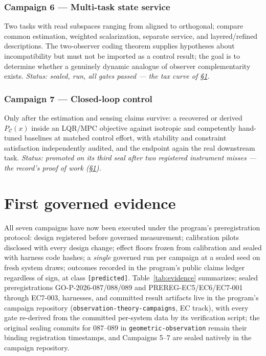 \documentclass[letterpaper,onecolumn]{IEEEtran}
\theoremstyle{definition}
\theoremstyle{remark}
\newcommand{\PC}{P_{\mathcal{C}}}
\begin{document}
\subsubsection*{Campaign 6 --- Multi-task state service}
Two tasks with read subspaces ranging from aligned to orthogonal; compare
common estimation, weighted scalarization, separate service, and
layered/refined descriptions. The two-observer coding theorem supplies
hypotheses about incompatibility but must not be imported as a control
result; the goal is to determine whether a genuinely dynamic analogue of
observer complementarity exists.
\emph{Status: sealed, run, all gates passed --- the tax curve of
\S\ref{sec:evidence}.}

\subsubsection*{Campaign 7 --- Closed-loop control}
Only after the estimation and sensing claims survive: a recovered or derived
$\PC(x)$ inside an LQR/MPC objective against isotropic and competently
hand-tuned baselines at matched control effort, with stability and
constraint satisfaction independently audited, and the endpoint again the
real downstream task.
\emph{Status: promoted on its third seal after two registered instrument
misses --- the record's proof of work (\S\ref{sec:evidence}).}

\section{First governed evidence}
\label{sec:evidence}

All seven campaigns have now been executed under the program's
preregistration protocol: design registered before governed measurement;
calibration pilots disclosed with every design change; effect floors frozen
from calibration and sealed with harness code hashes; a \emph{single}
governed run per campaign at a sealed seed on fresh system draws; outcomes
recorded in the program's public claims ledger regardless of sign, at class
\texttt{[predicted]}. Table~\ref{tab:evidence} summarizes; sealed
preregistrations GO-P-2026-087/088/089 and PREREG-EC5/EC6/EC7-001
through EC7-003, harnesses, and committed result artifacts live in the
program's campaign repository (\texttt{observation-theory-campaigns}, EC
track), with every gate re-derived from the committed per-system data by
its verification script; the original sealing commits for 087--089 in
\texttt{geometric-observation} remain their binding registration
timestamps, and Campaigns 5--7 are sealed natively in the campaign
repository.
\end{document}

